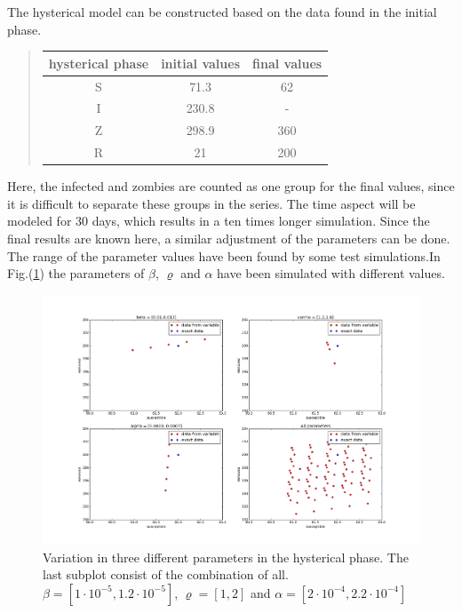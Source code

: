 \documentclass[%
twoside,                 %
final,                   %
chapterprefix=true,      %
open=right               %
10pt]{book}
\begin{document}
\vspace{3mm}




\vspace{3mm}


The hysterical model can be constructed based on the data found in the initial phase. 


\begin{quote}
\begin{tabular}{ccc}
\hline
\multicolumn{1}{c}{ hysterical phase } & \multicolumn{1}{c}{ initial values } & \multicolumn{1}{c}{ final values } \\
\hline
S                & 71.3           & 62           \\
I                & 230.8          & -            \\
Z                & 298.9          & 360          \\
R                & 21             & 200          \\
\hline
\end{tabular}
\end{quote}

\noindent
Here, the infected and zombies are counted as one group for the final values, since it is difficult to separate these groups in the series. The time aspect will be modeled for 30 days, which results in a ten times longer simulation. Since the final results are known here, a similar adjustment of the parameters can be done. The range of the parameter values have been found by some test simulations.In Fig.(\ref{fig:hysterical_variations}) the parameters of $\beta$, $\varrho$ and $\alpha$ have been simulated with different values. 


\begin{figure}[ht]
  \centerline{\includegraphics[width=0.9\linewidth]{1_fig/check_parameters_hysterical_2.png}}
  \caption{
  \label{fig:hysterical_variations} Variation in three different parameters in the hysterical phase. The last subplot consist of the combination of all. $\beta=[1\cdot10^{-5},1.2\cdot10^{-5}]$, $\varrho=[1,2]$ and $\alpha=[2\cdot10^{-4},2.2\cdot10^{-4}]$
  }
\end{figure}
\end{document}
